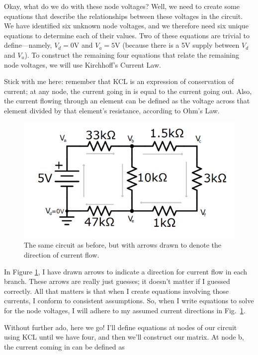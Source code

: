 \par
Okay, what do we do with these node voltages? Well, we need to create some equations that describe the relationships between these voltages in the circuit. We have identified six unknown node voltages, and we therefore need six unique equations to determine each of their values. Two of these equations are trivial to define---namely, $V_d=0$V and $V_a=5$V (because there is a 5V supply between $V_d$ and $V_a$). To construct the remaining four equations that relate the remaining node voltages, we will use Kirchhoff's Current Law. 
\par
Stick with me here: remember that KCL is an expression of conservation of current; at any node, the current going in is equal to the current going out. Also, the current flowing through an element can be defined as the voltage across that element divided by that element's resistance, according to Ohm's Law. 
\begin{figure}[h!]
\centering
\includegraphics[width=4.65in]{figures/nodeVoltageExCircuit_nodeVsAnnotatedCurrentsDrawn.png}
\caption{The same circuit as before, but with arrows drawn to denote the direction of current flow.}
\label{nodeVoltageExCircuit_nodeVsAnnotatedCurrentsDrawn}
\end{figure}
In Figure \ref{nodeVoltageExCircuit_nodeVsAnnotatedCurrentsDrawn}, I have drawn arrows to indicate a direction for current flow in each branch. These arrows are really just guesses; it doesn't matter if I guessed correctly. All that matters is that when I create equations involving those currents, I conform to consistent assumptions. So, when I write equations to solve for the node voltages, I will adhere to my assumed current directions in Fig.~\ref{nodeVoltageExCircuit_nodeVsAnnotatedCurrentsDrawn}. 
\par
Without further ado, here we go! I'll define equations at nodes of our circuit using KCL until we have four, and then we'll construct our matrix. At node b, the current coming in can be defined as
